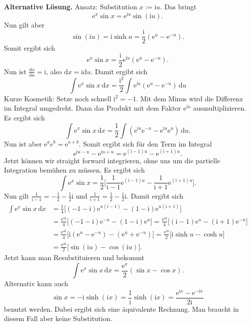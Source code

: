 \documentclass[a4paper,10pt,fleqn,twoside]{scrartcl}
\numberwithin{equation}{section}
\newcommand{\ui}{\mathrm i}
\newcommand{\ee}{\mathrm e}
\newcommand{\strong}[1]{{\normalfont\sffamily\bfseries #1}}
\theoremstyle{Aufgabe}
\begin{document}
\strong{Alternative Lösung.}
Ansatz: Substitution $x:=\ui u$. Das bringt
\begin{equation}
\ee^x\sin x = \ee^{\ui u}\sin(\ui u).
\end{equation}
Nun gilt aber
\begin{equation}
\sin(\ui u)=\ui\sinh u = \frac{\ui}{2}(\ee^u-\ee^{-u}).
\end{equation}
Somit ergibt sich
\begin{equation}
\ee^x\sin x = \frac{\ui}{2}\ee^{\ui u}(\ee^u-\ee^{-u}).
\end{equation}
Nun ist $\frac{\mathrm dx}{\mathrm du}=\ui$, also
$\mathrm dx=\ui\mathrm du$. Damit ergibt sich
\begin{equation}
\int \ee^x\sin x\,\mathrm dx
= \frac{\ui^2}{2}\int \ee^{\ui u}(\ee^u-\ee^{-u})\,\mathrm du
\end{equation}
Kurze Kosmetik: Setze noch schnell $\ui^2=-1$. Mit dem Minus wird
die Differenz im Integral umgedreht. Dann das Produkt mit dem
Faktor $\ee^{\ui u}$ ausmultiplizieren. Es ergibt sich
\begin{equation}
\int \ee^x\sin x\,\mathrm dx
= \frac{1}{2}\int (\ee^{\ui u}\ee^{-u}-\ee^{\ui u}\ee^u)\,\mathrm du.
\end{equation}
Nun ist aber $\ee^a e^b=\ee^{a+b}$. Somit ergibt sich
für den Term im Integral
\begin{equation}
\ee^{\ui u-u}-\ee^{\ui u+u} = \ee^{(\ui-1)u}-\ee^{(\ui+1)u}.
\end{equation}
Jetzt können wir straight forward integrieren, ohne uns um
die partielle Integration bemühen zu müssen. Es ergibt sich
\begin{equation}
\int \ee^x\sin x
= \frac{1}{2}\bigg[
\frac{1}{\ui-1}\ee^{(\ui-1)u}-\frac{1}{\ui+1}\ee^{(\ui+1)u}
\bigg].
\end{equation}
Nun gilt $\frac{1}{\ui-1}=-\frac{1}{2}-\frac{1}{2}\ui$ und
$\frac{1}{\ui+1} = \frac{1}{2}-\frac{1}{2}\ui$. Damit ergibt sich
\begin{align}
\int \ee^x\sin x\,\mathrm dx
&= \frac{1}{4}\Big[(-1-\ui)\ee^{u(\ui-1)}-(1-\ui)\ee^{u(\ui+1)}\Big]\\
&= \frac{\ee^{u\ui}}{4}\Big[(-1-\ui)\ee^{-u}-(1-\ui)\ee^u\Big]
= \frac{\ee^{u\ui}}{4}\Big[(\ui-1)\ee^u-(\ui+1)\ee^{-u}\Big]\\
&= \frac{\ee^{u\ui}}{4}\Big[\ui(\ee^u-\ee^{-u})-(\ee^u+\ee^{-u})\Big]
= \frac{\ee^{u\ui}}{2}\Big[\ui\sinh u-\cosh u\Big]\\
&= \frac{\ee^{u\ui}}{2}\Big[\sin(\ui u)-\cos(\ui u)\Big].
\end{align}
Jetzt kann man Resubstituieren und bekommt
\begin{equation}
\int \ee^x\sin x\,\mathrm dx = \frac{\ee^x}{2}(\sin x-\cos x).
\end{equation}
Alternativ kann auch
\begin{equation}
\sin x = -\ui\sinh(ix) = \frac{1}{\ui}\sinh(\ui x)
=\frac{\ee^{\ui x}-\ee^{-\ui x}}{2\ui}
\end{equation}
benutzt werden. Dabei ergibt sich eine äquivalente
Rechnung. Man braucht in diesem Fall aber keine Substitution.
\end{document}
